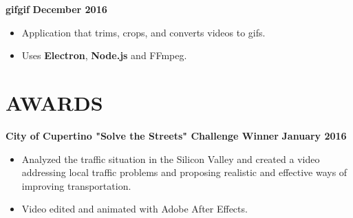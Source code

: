 \documentclass{res}
\begin{document}
\begin{resume}
		{\bf gifgif} \hfill {\bf December 2016} \\
			\vspace{-3.5mm}
			\begin{itemize} \itemsep -2pt
				\item Application that trims, crops, and converts videos to gifs.
				\item Uses {\bf Electron}, {\bf Node.js} and FFmpeg.
			\end{itemize}

		\section{AWARDS}
		\vspace{6pt}

		{\bf City of Cupertino "Solve the Streets" Challenge Winner} \hfill {\bf January 2016} \\
			\vspace{-3.5mm}
			\begin{itemize} \itemsep -2pt
				\item Analyzed the traffic situation in the Silicon Valley and created a video addressing local traffic problems
					and proposing realistic and effective ways of improving transportation.
				\item Video edited and animated with Adobe After Effects.
			\end{itemize}

	\end{resume} 
\end{document}
